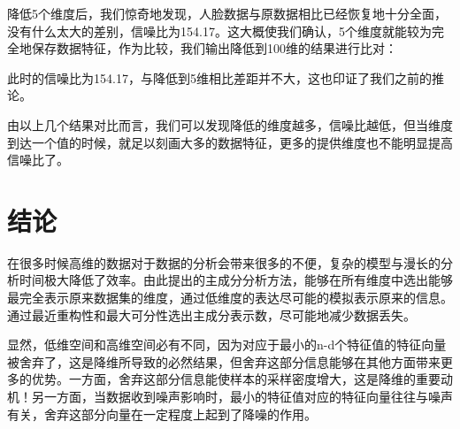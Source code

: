 \documentclass[12pt]{article}
\begin{document}
降低5个维度后，我们惊奇地发现，人脸数据与原数据相比已经恢复地十分全面，没有什么太大的差别，信噪比为154.17。这大概使我们确认，5个维度就能较为完全地保存数据特征，作为比较，我们输出降低到100维的结果进行比对：\par
\begin{figure}[H]
    \centering
\end{figure}
此时的信噪比为154.17，与降低到5维相比差距并不大，这也印证了我们之前的推论。\par
由以上几个结果对比而言，我们可以发现降低的维度越多，信噪比越低，但当维度到达一个值的时候，就足以刻画大多的数据特征，更多的提供维度也不能明显提高信噪比了。\par
\section{结论}
在很多时候高维的数据对于数据的分析会带来很多的不便，复杂的模型与漫长的分析时间极大降低了效率。由此提出的主成分分析方法，能够在所有维度中选出能够最完全表示原来数据集的维度，通过低维度的表达尽可能的模拟表示原来的信息。通过最近重构性和最大可分性选出主成分表示数，尽可能地减少数据丢失。\par
显然，低维空间和高维空间必有不同，因为对应于最小的n-d个特征值的特征向量被舍弃了，这是降维所导致的必然结果，但舍弃这部分信息能够在其他方面带来更多的优势。一方面，舍弃这部分信息能使样本的采样密度增大，这是降维的重要动机！另一方面，当数据收到噪声影响时，最小的特征值对应的特征向量往往与噪声有关，舍弃这部分向量在一定程度上起到了降噪的作用。
\end{document}
